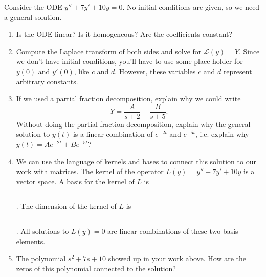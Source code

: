 \begin{problem}
 Consider the ODE $y''+7y'+10y=0$.  No initial conditions are given, so we need a general solution.
 \begin{enumerate}
 \item Is the ODE linear? Is it homogeneous? Are the coefficients constant?
 \item Compute the Laplace transform of both sides and solve for $\mathscr{L}(y) = Y$. Since we don't have initial conditions, you'll have to use some place holder for $y(0)$ and $y'(0)$, like $c$ and $d$.  However, these variables $c$ and $d$ represent arbitrary constants.
 \item If we used a partial fraction decomposition, explain why we could write $$Y=\frac{A}{s+2}+\frac{B}{s+5}.$$ Without doing the partial fraction decomposition, explain why the general solution to $y(t)$ is a linear combination of $e^{-2t}$ and $e^{-5t}$, i.e. explain why $y(t)=Ae^{-2t}+Be^{-5t}$? 
 \item 
{}
We can use the language of kernels and bases to connect this solution to our work with matrices. The kernel of the operator $L(y) = y''+7y'+10y$ is a vector space.  A basis for the kernel of $L$ is \rule{1in}{.5pt}.  The dimension of the kernel of $L$ is \rule{1in}{.5pt}. All solutions to $L(y)=0$ are linear combinations of these two basis elements. 
 \item 
The polynomial $s^2+7s+10$ showed up in your work above. How are the zeros of this polynomial connected to the solution?
\end{enumerate}
\end{problem}






\mysubsection{\ideaD}

